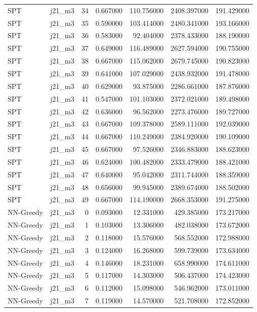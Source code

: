 \begin{tabular}{llrrrrr}
SPT & j21_m3 & 34 & 0.667000 & 110.756000 & 2408.397000 & 191.429000 \\
SPT & j21_m3 & 35 & 0.590000 & 103.414000 & 2480.341000 & 193.166000 \\
SPT & j21_m3 & 36 & 0.583000 & 92.404000 & 2378.433000 & 188.190000 \\
SPT & j21_m3 & 37 & 0.649000 & 116.489000 & 2627.594000 & 190.755000 \\
SPT & j21_m3 & 38 & 0.667000 & 115.062000 & 2679.745000 & 190.823000 \\
SPT & j21_m3 & 39 & 0.641000 & 107.029000 & 2438.932000 & 191.478000 \\
SPT & j21_m3 & 40 & 0.629000 & 93.875000 & 2286.661000 & 187.876000 \\
SPT & j21_m3 & 41 & 0.547000 & 101.103000 & 2372.021000 & 189.498000 \\
SPT & j21_m3 & 42 & 0.636000 & 96.562000 & 2273.476000 & 189.727000 \\
SPT & j21_m3 & 43 & 0.667000 & 109.378000 & 2589.111000 & 192.039000 \\
SPT & j21_m3 & 44 & 0.667000 & 110.249000 & 2384.920000 & 190.109000 \\
SPT & j21_m3 & 45 & 0.667000 & 97.526000 & 2346.883000 & 188.623000 \\
SPT & j21_m3 & 46 & 0.624000 & 100.482000 & 2333.479000 & 188.421000 \\
SPT & j21_m3 & 47 & 0.640000 & 95.042000 & 2311.744000 & 188.359000 \\
SPT & j21_m3 & 48 & 0.656000 & 99.945000 & 2389.674000 & 188.502000 \\
SPT & j21_m3 & 49 & 0.667000 & 114.190000 & 2668.353000 & 191.275000 \\
NN-Greedy & j21_m3 & 0 & 0.093000 & 12.331000 & 429.385000 & 173.217000 \\
NN-Greedy & j21_m3 & 1 & 0.103000 & 13.306000 & 482.038000 & 173.672000 \\
NN-Greedy & j21_m3 & 2 & 0.118000 & 15.576000 & 568.552000 & 172.988000 \\
NN-Greedy & j21_m3 & 3 & 0.124000 & 16.268000 & 599.739000 & 173.634000 \\
NN-Greedy & j21_m3 & 4 & 0.146000 & 18.231000 & 658.990000 & 174.611000 \\
NN-Greedy & j21_m3 & 5 & 0.117000 & 14.303000 & 506.437000 & 174.423000 \\
NN-Greedy & j21_m3 & 6 & 0.112000 & 15.098000 & 546.962000 & 173.011000 \\
NN-Greedy & j21_m3 & 7 & 0.119000 & 14.570000 & 521.708000 & 172.852000 \\

\end{tabular}
